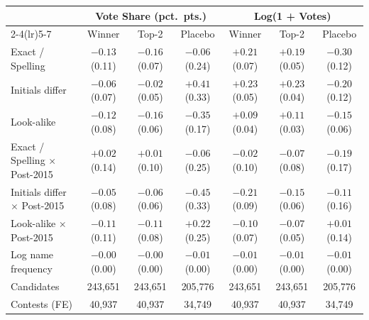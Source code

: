 \begin{tabular}{lcccccc}
\toprule
 & \multicolumn{3}{c}{Vote Share (pct.\ pts.)} & \multicolumn{3}{c}{Log(1 + Votes)} \\
\cmidrule(lr){2-4}\cmidrule(lr){5-7}
 & Winner & Top-2 & Placebo & Winner & Top-2 & Placebo \\
\midrule
Exact / Spelling & $-0.13$ (0.11) & $-0.16$ (0.07) & $-0.06$ (0.24) & $+0.21$ (0.07) & $+0.19$ (0.05) & $-0.30$ (0.12) \\
Initials differ & $-0.06$ (0.07) & $-0.02$ (0.05) & $+0.41$ (0.33) & $+0.23$ (0.05) & $+0.23$ (0.04) & $-0.20$ (0.12) \\
Look-alike & $-0.12$ (0.08) & $-0.16$ (0.06) & $-0.35$ (0.17) & $+0.09$ (0.04) & $+0.11$ (0.03) & $-0.15$ (0.06) \\
Exact / Spelling $\times$ Post-2015 & $+0.02$ (0.14) & $+0.01$ (0.10) & $-0.06$ (0.25) & $-0.02$ (0.10) & $-0.07$ (0.08) & $-0.19$ (0.17) \\
Initials differ $\times$ Post-2015 & $-0.05$ (0.08) & $-0.06$ (0.06) & $-0.45$ (0.33) & $-0.21$ (0.09) & $-0.15$ (0.06) & $-0.11$ (0.16) \\
Look-alike $\times$ Post-2015 & $-0.11$ (0.11) & $-0.11$ (0.08) & $+0.22$ (0.25) & $-0.10$ (0.07) & $-0.07$ (0.05) & $+0.01$ (0.14) \\
Log name frequency & $-0.00$ (0.00) & $-0.00$ (0.00) & $-0.01$ (0.00) & $-0.01$ (0.00) & $-0.01$ (0.00) & $-0.01$ (0.00) \\
\midrule
Candidates & 243,651 & 243,651 & 205,776 & 243,651 & 243,651 & 205,776 \\
Contests (FE) & 40,937 & 40,937 & 34,749 & 40,937 & 40,937 & 34,749 \\
\bottomrule
\end{tabular}
